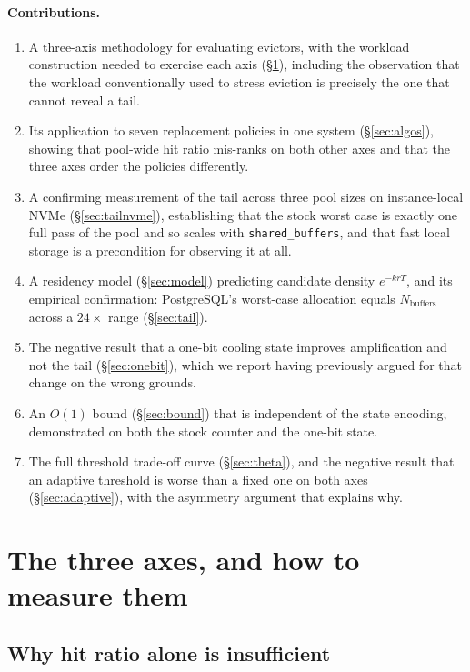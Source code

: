 \documentclass[sigconf,nonacm]{acmart}
\begin{document}
\paragraph{Contributions.}
\begin{enumerate}
\item A three-axis methodology for evaluating evictors, with the workload
  construction needed to exercise each axis (\S\ref{sec:method}), including the
  observation that the workload conventionally used to stress eviction is
  precisely the one that cannot reveal a tail.
\item Its application to seven replacement policies in one system
  (\S\ref{sec:algos}), showing that pool-wide hit ratio mis-ranks on both other
  axes and that the three axes order the policies differently.
\item A confirming measurement of the tail across three pool sizes on
  instance-local NVMe (\S\ref{sec:tailnvme}), establishing that the stock
  worst case is exactly one full pass of the pool and so scales with
  \texttt{shared\_buffers}, and that fast local storage is a precondition for
  observing it at all.
\item A residency model (\S\ref{sec:model}) predicting candidate density
  $e^{-krT}$, and its empirical confirmation: PostgreSQL's worst-case
  allocation equals $N_{\text{buffers}}$ across a $24\times$ range
  (\S\ref{sec:tail}).
\item The negative result that a one-bit cooling state improves amplification
  and not the tail (\S\ref{sec:onebit}), which we report having previously
  argued for that change on the wrong grounds.
\item An $O(1)$ bound (\S\ref{sec:bound}) that is independent of the state
  encoding, demonstrated on both the stock counter and the one-bit state.
\item The full threshold trade-off curve (\S\ref{sec:theta}), and the negative
  result that an adaptive threshold is worse than a fixed one on both axes
  (\S\ref{sec:adaptive}), with the asymmetry argument that explains why.
\end{enumerate}

\section{The three axes, and how to measure them}
\label{sec:method}

\subsection{Why hit ratio alone is insufficient}
\end{document}

